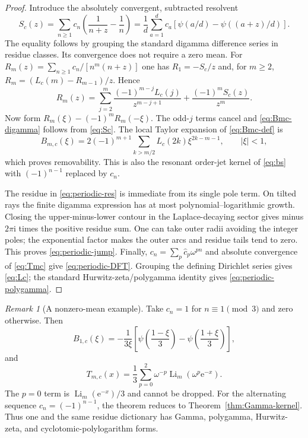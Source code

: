 \documentclass[11pt,a4paper]{article}
\theoremstyle{definition}\newtheorem{definition}[theorem]{Definition}
\theoremstyle{remark}\newtheorem{remark}[theorem]{Remark}
\newcommand{\Li}{\operatorname{Li}}
\newcommand{\ii}{\mathrm i}
\newcommand{\ee}{\mathrm e}
\numberwithin{equation}{section}
\begin{document}
\begin{proof}
Introduce the absolutely convergent, subtracted resolvent
\begin{equation}\label{eq:Sc}
 S_c(z)=\sum_{n\ge1}c_n\left(\frac1{n+z}-\frac1n\right)
       =\frac1d\sum_{a=1}^dc_a
          \left[\psi(a/d)-\psi((a+z)/d)\right].
\end{equation}
The equality follows by grouping the standard digamma difference series
in residue classes. Its convergence does not require a zero mean.
For
$R_m(z)=\sum_{n\ge1}c_n/[n^m(n+z)]$ one has
$R_1=-S_c/z$ and, for $m\ge2$,
$R_m=(L_c(m)-R_{m-1})/z$. Hence
\[
 R_m(z)=\sum_{j=2}^m\frac{(-1)^{m-j}L_c(j)}{z^{m-j+1}}
                   +\frac{(-1)^m S_c(z)}{z^m}.
\]
Now form $R_m(\xi)-(-1)^mR_m(-\xi)$. The odd-$j$ terms cancel and
\eqref{eq:Bmc-digamma} follows from \eqref{eq:Sc}.
The local Taylor expansion of \eqref{eq:Bmc-def} is
\begin{equation}\label{eq:Bmc-series}
 B_{m,c}(\xi)=2(-1)^{m+1}
         \sum_{k>m/2}L_c(2k)\xi^{2k-m-1},\qquad |\xi|<1,
\end{equation}
which proves removability. This is also the resonant order-jet kernel of
\eqref{eq:bs} with $(-1)^{n-1}$ replaced by $c_n$.

The residue in \eqref{eq:periodic-res} is immediate from its single pole
term. On tilted rays the finite digamma expression has at most
polynomial--logarithmic growth. Closing the upper-minus-lower contour in
the Laplace-decaying sector gives minus $2\pi\ii$ times the positive
residue sum. One can take outer radii avoiding the integer poles; the
exponential factor makes the outer arcs and residue tails tend to zero.
This proves \eqref{eq:periodic-jump}.
Finally, $c_n=\sum_p\widehat c_p\omega^{pn}$ and absolute convergence of
\eqref{eq:Tmc} give \eqref{eq:periodic-DFT}. Grouping the defining Dirichlet
series gives \eqref{eq:Lc}; the standard Hurwitz-zeta/polygamma identity
gives \eqref{eq:periodic-polygamma}.
\end{proof}

\begin{remark}[A nonzero-mean example]\label{rmk:zero-mode}
Take $c_n=1$ for $n\equiv1\pmod3$ and zero otherwise. Then
\[
 B_{1,c}(\xi)=-\frac1{3\xi}
       \left[\psi\!\left(\frac{1-\xi}{3}\right)
             -\psi\!\left(\frac{1+\xi}{3}\right)\right],
\]
and
\[
 T_{m,c}(x)=\frac13\sum_{p=0}^2
                  \omega^{-p}\Li_m(\omega^p\ee^{-x}).
\]
The $p=0$ term is $\Li_m(\ee^{-x})/3$ and cannot be dropped.
For the alternating sequence $c_n=(-1)^{n-1}$, the theorem reduces to
Theorem~\ref{thm:Gamma-kernel}. Thus one and the same residue dictionary
has Gamma, polygamma, Hurwitz-zeta, and cyclotomic-polylogarithm forms.
\end{remark}
\end{document}
